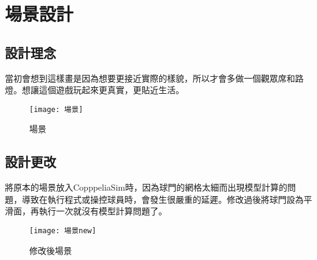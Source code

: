 \chapter{場景設計}
\section{設計理念}
 當初會想到這樣畫是因為想要更接近實際的樣貌，所以才會多做一個觀眾席和路燈。想讓這個遊戲玩起來更真實，更貼近生活。\\[6pt]
\begin{figure}[hbt!]
\begin{center}
\texttt{[image: 場景]}
\caption{\Large 場景}\label{場景}
\end{center}
\end{figure} 

\newpage

\section{設計更改}

將原本的場景放入CopppeliaSim時，因為球門的網格太細而出現模型計算的問題，導致在執行程式或操控球員時，會發生很嚴重的延遲。修改過後將球門設為平滑面，再執行一次就沒有模型計算問題了。\\[6pt]

\begin{figure}[hbt!]
\begin{center}
\texttt{[image: 場景new]}
\caption{\Large 修改後場景}\label{場景new}
\end{center}
\end{figure} 

\newpage